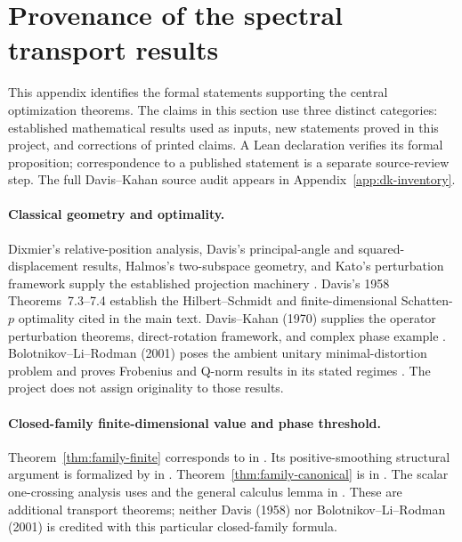 \section{Provenance of the spectral transport results}
\label{app:transport-provenance}

This appendix identifies the formal statements supporting the central
optimization theorems.  The claims in this section use three distinct
categories: established mathematical results used as inputs, new
statements proved in this project, and corrections of printed claims.
A Lean declaration verifies its formal proposition; correspondence to a
published statement is a separate source-review step.  The full
Davis--Kahan source audit appears in Appendix~\ref{app:dk-inventory}.

\paragraph{Classical geometry and optimality.}
Dixmier's relative-position analysis, Davis's principal-angle and
squared-displacement results, Halmos's two-subspace geometry, and
Kato's perturbation framework supply the established projection
machinery \citep{dixmier1948position,davis1958separation,halmos1969two,kato1966perturbation}.
Davis's 1958 Theorems~7.3--7.4 establish the Hilbert--Schmidt and
finite-dimensional Schatten-$p$ optimality cited in the main text.
Davis--Kahan (1970) supplies the operator perturbation theorems,
direct-rotation framework, and complex phase example
\citep{davis1970rotation}.  Bolotnikov--Li--Rodman (2001) poses the
ambient unitary minimal-distortion problem and proves Frobenius and
Q-norm results in its stated regimes \citep{bolotnikov2001minimal}.
The project does not assign originality to those results.

\paragraph{Closed-family finite-dimensional value and phase threshold.}
Theorem~\ref{thm:family-finite} corresponds to
in
.
Its positive-smoothing structural argument is formalized by
in
.
Theorem~\ref{thm:family-canonical} is
in
.
The scalar one-crossing analysis uses
and the general calculus lemma in
.
These are additional transport theorems; neither Davis (1958) nor
Bolotnikov--Li--Rodman (2001) is credited with this particular
closed-family formula.

